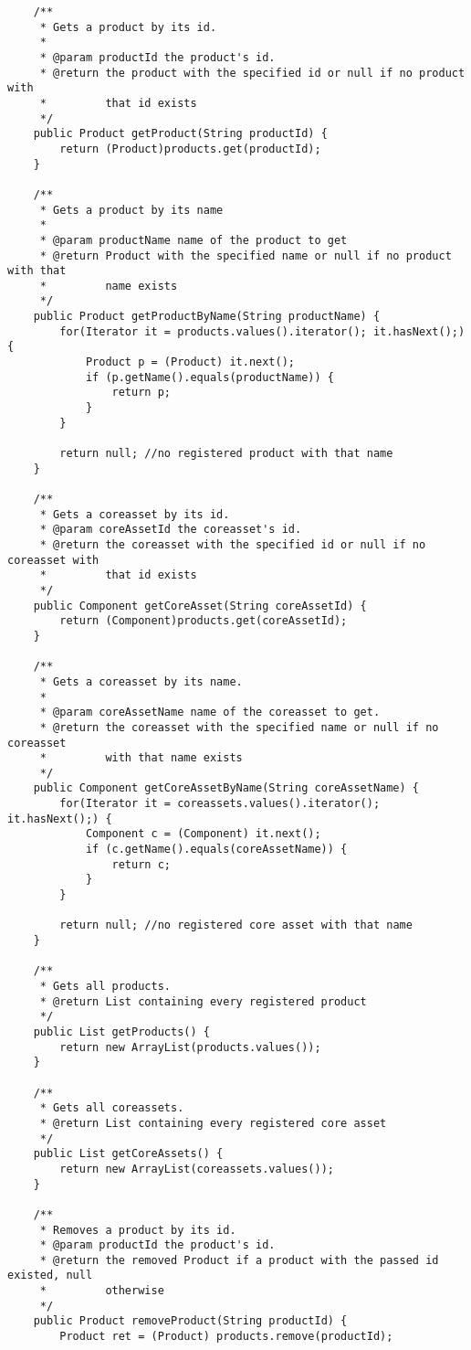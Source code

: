 \begin{verbatim}
	/**
	 * Gets a product by its id.
     *  
	 * @param productId the product's id.
     * @return the product with the specified id or null if no product with
     *         that id exists
	 */
	public Product getProduct(String productId) {
	    return (Product)products.get(productId);
	}
	
    /**
     * Gets a product by its name
     * 
     * @param productName name of the product to get
     * @return Product with the specified name or null if no product with that
     *         name exists
     */
    public Product getProductByName(String productName) {
        for(Iterator it = products.values().iterator(); it.hasNext();) {
            Product p = (Product) it.next();
            if (p.getName().equals(productName)) {
                return p;
            }
        }
        
        return null; //no registered product with that name
    }
    
	/**
	 * Gets a coreasset by its id.
	 * @param coreAssetId the coreasset's id.
     * @return the coreasset with the specified id or null if no coreasset with
     *         that id exists
	 */
	public Component getCoreAsset(String coreAssetId) {
	    return (Component)products.get(coreAssetId);
	}
    
    /**
     * Gets a coreasset by its name.
     *  
     * @param coreAssetName name of the coreasset to get.
     * @return the coreasset with the specified name or null if no coreasset 
     *         with that name exists
     */
    public Component getCoreAssetByName(String coreAssetName) {
        for(Iterator it = coreassets.values().iterator(); it.hasNext();) {
            Component c = (Component) it.next();
            if (c.getName().equals(coreAssetName)) {
                return c;
            }
        }
        
        return null; //no registered core asset with that name
    }
	
	/**
     * Gets all products.
     * @return List containing every registered product
	 */
	public List getProducts() {
	    return new ArrayList(products.values());
	}
	
	/**
	 * Gets all coreassets.
     * @return List containing every registered core asset
	 */
	public List getCoreAssets() {
	    return new ArrayList(coreassets.values());
	}
	
	/**
	 * Removes a product by its id.
	 * @param productId the product's id.
     * @return the removed Product if a product with the passed id existed, null 
     *         otherwise
	 */
	public Product removeProduct(String productId) {
		Product ret = (Product) products.remove(productId);
        

\end{verbatim}
